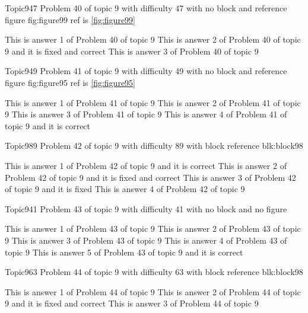\documentclass[master]{exam}
\begin{document}
\begin{problem}{Topic9}{47}
	Problem 40 of topic 9 with difficulty 47 with no block and reference figure fig:figure99 ref is \ref{fig:figure99}
	\begin{answers}
		\answer This is answer 1 of Problem 40 of topic 9 
		 This is answer 2 of Problem 40 of topic 9 and it is fixed and correct
		\answer This is answer 3 of Problem 40 of topic 9 
	\end{answers}
\end{problem}

\begin{problem}{Topic9}{49}
	Problem 41 of topic 9 with difficulty 49 with no block and reference figure fig:figure95 ref is \ref{fig:figure95}
	\begin{answers}
		\answer This is answer 1 of Problem 41 of topic 9 
		\answer This is answer 2 of Problem 41 of topic 9 
		\answer This is answer 3 of Problem 41 of topic 9 
		\answer[correct] This is answer 4 of Problem 41 of topic 9 and it is correct
	\end{answers}
\end{problem}

\begin{problem}[requires=blk:block98]{Topic9}{89}
	Problem 42 of topic 9 with difficulty 89 with block reference blk:block98
	\begin{answers}
		\answer[correct] This is answer 1 of Problem 42 of topic 9 and it is correct
		 This is answer 2 of Problem 42 of topic 9 and it is fixed and correct
		\answer[fixed] This is answer 3 of Problem 42 of topic 9 and it is fixed
		\answer This is answer 4 of Problem 42 of topic 9 
	\end{answers}
\end{problem}

\begin{problem}{Topic9}{41}
	Problem 43 of topic 9 with difficulty 41 with no block and no figure
	\begin{answers}
		\answer This is answer 1 of Problem 43 of topic 9 
		\answer This is answer 2 of Problem 43 of topic 9 
		\answer This is answer 3 of Problem 43 of topic 9 
		\answer This is answer 4 of Problem 43 of topic 9 
		\answer[correct] This is answer 5 of Problem 43 of topic 9 and it is correct
	\end{answers}
\end{problem}

\begin{problem}[requires=blk:block98]{Topic9}{63}
	Problem 44 of topic 9 with difficulty 63 with block reference blk:block98
	\begin{answers}
		\answer This is answer 1 of Problem 44 of topic 9 
		 This is answer 2 of Problem 44 of topic 9 and it is fixed and correct
		\answer This is answer 3 of Problem 44 of topic 9 
	\end{answers}
\end{problem}
\end{document}
